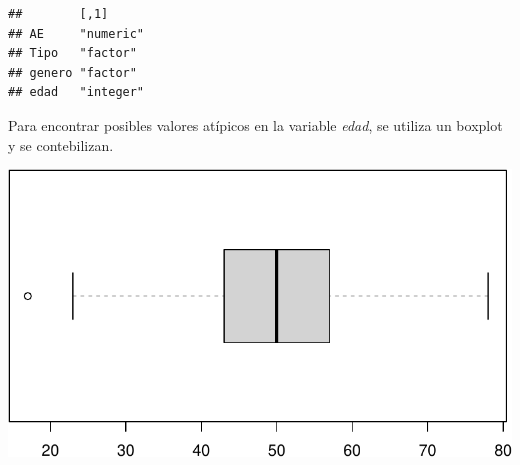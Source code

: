 \documentclass[
]{article}
\newenvironment{Shaded}{\begin{snugshade}}{\end{snugshade}}
\newcommand{\AttributeTok}[1]{\textcolor[rgb]{0.77,0.63,0.00}{#1}}
\newcommand{\ConstantTok}[1]{\textcolor[rgb]{0.00,0.00,0.00}{#1}}
\newcommand{\FunctionTok}[1]{\textcolor[rgb]{0.00,0.00,0.00}{#1}}
\newcommand{\NormalTok}[1]{#1}
\newcommand{\OtherTok}[1]{\textcolor[rgb]{0.56,0.35,0.01}{#1}}
\newcommand{\SpecialCharTok}[1]{\textcolor[rgb]{0.00,0.00,0.00}{#1}}
\begin{document}
\vspace{0.3cm}

\begin{Shaded}
\end{Shaded}

\begin{verbatim}
##        [,1]     
## AE     "numeric"
## Tipo   "factor" 
## genero "factor" 
## edad   "integer"
\end{verbatim}

\vspace{0.3cm}

Para encontrar posibles valores atípicos en la variable \emph{edad}, se
utiliza un boxplot y se contebilizan.

\vspace{0.3cm}

\begin{Shaded}
\end{Shaded}

\includegraphics{A4_files/figure-latex/unnamed-chunk-12-1.pdf}
\end{document}
